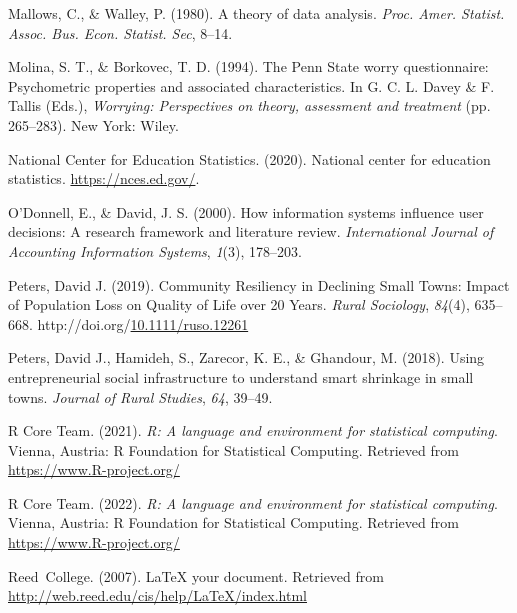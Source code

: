 \documentclass[print]{nuthesis}
\newlength{\cslhangindent}
\newenvironment{CSLReferences}[2]%
{\setlength{\parindent}{0pt}%
\everypar{\setlength{\hangindent}{\cslhangindent}}\ignorespaces}%
{\par}
\begin{document}
\begin{CSLReferences}{1}{0}
\leavevmode{}%
Mallows, C., \& Walley, P. (1980). A theory of data analysis. \emph{Proc. Amer. Statist. Assoc. Bus. Econ. Statist. Sec}, 8--14.

\leavevmode{}%
Molina, S. T., \& Borkovec, T. D. (1994). The {P}enn {S}tate worry questionnaire: Psychometric properties and associated characteristics. In G. C. L. Davey \& F. Tallis (Eds.), \emph{Worrying: Perspectives on theory, assessment and treatment} (pp. 265--283). New York: Wiley.

\leavevmode{}%
National Center for Education Statistics. (2020). National center for education statistics. \url{https://nces.ed.gov/}.

\leavevmode{}%
O'Donnell, E., \& David, J. S. (2000). How information systems influence user decisions: A research framework and literature review. \emph{International Journal of Accounting Information Systems}, \emph{1}(3), 178--203.

\leavevmode{}%
Peters, David J. (2019). Community {Resiliency} in {Declining} {Small} {Towns}: {Impact} of {Population} {Loss} on {Quality} of {Life} over 20 {Years}. \emph{Rural Sociology}, \emph{84}(4), 635--668. http://doi.org/\href{https://doi.org/10.1111/ruso.12261}{10.1111/ruso.12261}

\leavevmode{}%
Peters, David J., Hamideh, S., Zarecor, K. E., \& Ghandour, M. (2018). Using entrepreneurial social infrastructure to understand smart shrinkage in small towns. \emph{Journal of Rural Studies}, \emph{64}, 39--49.

\leavevmode{}%
R Core Team. (2021). \emph{R: A language and environment for statistical computing}. Vienna, Austria: R Foundation for Statistical Computing. Retrieved from \url{https://www.R-project.org/}

\leavevmode{}%
R Core Team. (2022). \emph{R: A language and environment for statistical computing}. Vienna, Austria: R Foundation for Statistical Computing. Retrieved from \url{https://www.R-project.org/}

\leavevmode{}%
Reed~College. (2007). LaTeX your document. Retrieved from \url{http://web.reed.edu/cis/help/LaTeX/index.html}


\end{CSLReferences}
\end{document}
